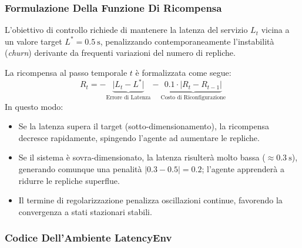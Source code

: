 \documentclass[11pt, a4paper]{article}
\begin{document}
\subsubsection{Formulazione Della Funzione Di Ricompensa}

L'obiettivo di controllo richiede di mantenere la latenza del servizio $L_t$ vicina a un valore target $L^* = \SI{0.5}{\second}$, penalizzando contemporaneamente l'instabilità (\emph{churn}) derivante da frequenti variazioni del numero di repliche.

La ricompensa al passo temporale $t$ è formalizzata come segue:
\begin{equation}
R_t = - \underbrace{\lvert L_t - L^* \rvert}_{\text{Errore di Latenza}} - \underbrace{0.1 \cdot \lvert R_{t} - R_{t-1} \rvert}_{\text{Costo di Riconfigurazione}}
\end{equation}
In questo modo:
\begin{itemize}[noitemsep]
    \item Se la latenza supera il target (sotto-dimensionamento), la ricompensa decresce rapidamente, spingendo l'agente ad aumentare le repliche.
    \item Se il sistema è sovra-dimensionato, la latenza risulterà molto bassa ($\approx \SI{0.3}{\second}$), generando comunque una penalità $\lvert 0.3 - 0.5 \rvert = 0.2$; l'agente apprenderà a ridurre le repliche superflue.
    \item Il termine di regolarizzazione penalizza oscillazioni continue, favorendo la convergenza a stati stazionari stabili.
\end{itemize}

\subsubsection{Codice Dell'Ambiente LatencyEnv}
\end{document}
